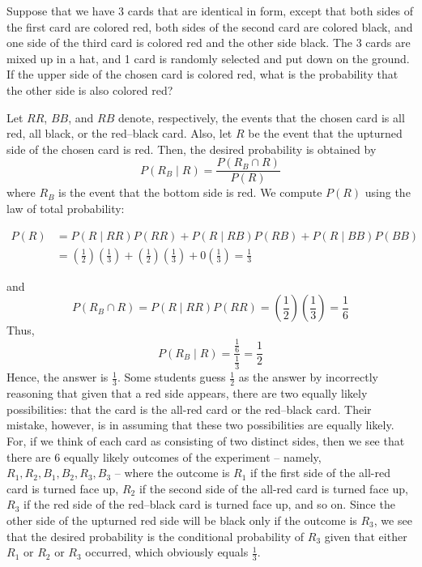        \begin{example}
       	Suppose that we have 3 cards that are identical in form, except that both sides of the first card are colored red, both sides of the second card are colored black, and one side of the third card is colored red and the other side black. The 3 cards are mixed up in a hat, and 1 card is randomly selected and put down on the ground. If the upper side of the chosen card is colored red, what is the probability that the other side is also colored red?
       
       \begin{solution}
       	Let \( RR \), \( BB \), and \( RB \) denote, respectively, the events that the chosen card is all red, all black, or the red--black card. Also, let \( R \) be the event that the upturned side of the chosen card is red. Then, the desired probability is obtained by
       	\[
       	P(R_B \mid R) = \frac{P(R_B \cap R)}{P(R)}
       	\]
       	where \( R_B \) is the event that the bottom side is red. We compute \( P(R) \) using the law of total probability:
       	
       	\begin{align*}
       		P(R) &= P(R \mid RR)P(RR) + P(R \mid RB)P(RB) + P(R \mid BB)P(BB)\\
       			& = \left(\frac{1}{2}\right)\left(\frac{1}{3}\right) + \left(\frac{1}{2}\right)\left(\frac{1}{3}\right) + 0\left(\frac{1}{3}\right) = \frac{1}{3}
       	\end{align*}
       	
       	and
       	\[
       	P(R_B \cap R) = P(R \mid RR)P(RR) = \left(\frac{1}{2}\right)\left(\frac{1}{3}\right) = \frac{1}{6}
       	\]
       	Thus,
       	\[
       	P(R_B \mid R) = \frac{\frac{1}{6}}{\frac{1}{3}} = \frac{1}{2}
       	\]
       	Hence, the answer is \(\frac{1}{3}\). Some students guess \(\frac{1}{2}\) as the answer by incorrectly reasoning that given that a red side appears, there are two equally likely possibilities: that the card is the all-red card or the red--black card. Their mistake, however, is in assuming that these two possibilities are equally likely. For, if we think of each card as consisting of two distinct sides, then we see that there are 6 equally likely outcomes of the experiment -- namely, \(R_1, R_2, B_1, B_2, R_3, B_3\) -- where the outcome is \(R_1\) if the first side of the all-red card is turned face up, \(R_2\) if the second side of the all-red card is turned face up, \(R_3\) if the red side of the red--black card is turned face up, and so on. Since the other side of the upturned red side will be black only if the outcome is \(R_3\), we see that the desired probability is the conditional probability of \(R_3\) given that either \(R_1\) or \(R_2\) or \(R_3\) occurred, which obviously equals \(\frac{1}{3}\).
       \end{solution}
    	\end{example}
    	
